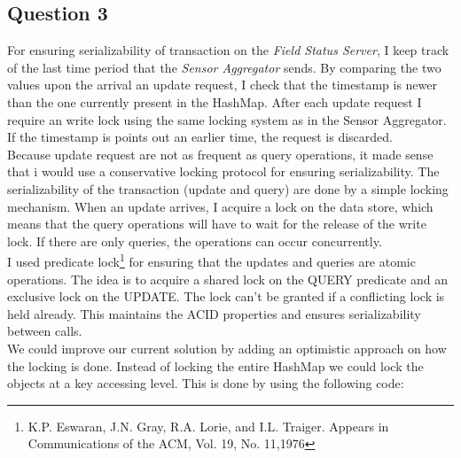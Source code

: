 \documentclass{article}      %
\begin{document}
\subsection* {Question 3}

For ensuring serializability of transaction on the \emph{Field Status Server}, I keep track of the last time period that the \emph{Sensor Aggregator} sends. By comparing the two values upon the arrival an update request, I check that the timestamp is newer than the one currently present in the HashMap. After each update request I require an write lock using the same locking system as in the Sensor Aggregator. If the timestamp is points out an earlier time, the request is discarded. \\

Because update request are not as frequent as query operations, it made sense that i would use a conservative locking protocol for ensuring serializability. 
The serializability of the transaction (update and query) are done by a simple locking mechanism. When an update arrives, I acquire a lock on the data store, which means that the query operations will have to wait for the release of the write lock. If there are only queries, the operations can occur concurrently.\\

I used predicate lock\footnote{K.P. Eswaran, J.N. Gray, R.A. Lorie, and I.L. Traiger.
Appears in Communications of the ACM, Vol. 19, No. 11,1976} for ensuring that the updates and queries are atomic operations.  The idea is to acquire a shared lock on the QUERY predicate and an exclusive lock on the UPDATE. The lock can't be granted if a conflicting lock is held already. This maintains the ACID properties and ensures serializability between calls.\\

We could improve our current solution by adding an optimistic approach on how the locking is done. Instead of locking the entire HashMap we could lock the objects at a key accessing level. This is done by using the following code: 
\end{document}

